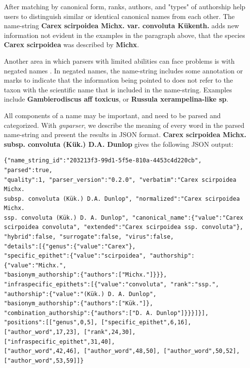 \documentclass{bmcart}
\begin{document}
After matching by canonical form, ranks, authors, and "types" of authorship
help users to distinguish similar or identical canonical names from each other.
The name-string \textbf{Carex scirpoidea Michx. var. convoluta Kükenth.} adds
new information not evident in the examples in the paragraph above, that the
species \textbf{Carex scirpoidea} was described by \textbf{Michx}.

Another area in which parsers with limited abilities can face  problems is with
negated names \cite{Patterson:inpress-a}. In negated names, the name-string
includes some annotation or marks to indicate that the information being
pointed to does not refer to the taxon with the scientific name that is
included in the name-string. Examples include \textbf{Gambierodiscus aff
toxicus}, or \textbf{Russula xerampelina-like sp}.

All components of a name may be important, and need to be parsed and
categorized. With \textit{gnparser}, we describe the meaning of every word in
the parsed name-string and present the results in JSON format.  \textbf{Carex
scirpoidea Michx.  subsp. convoluta (Kük.) D.A. Dunlop} gives the following
JSON output:

\vspace{0.5cm}

\begin{Verbatim}[fontsize=\small]
{"name_string_id":"203213f3-99d1-5f5e-810a-4453c4d220cb", "parsed":true,
"quality":1, "parser_version":"0.2.0", "verbatim":"Carex scirpoidea Michx.
subsp. convoluta (Kük.) D.A. Dunlop", "normalized":"Carex scirpoidea Michx.
ssp. convoluta (Kük.) D. A. Dunlop", "canonical_name":{"value":"Carex
scirpoidea convoluta", "extended":"Carex scirpoidea ssp. convoluta"},
"hybrid":false, "surrogate":false, "virus":false,
"details":[{"genus":{"value":"Carex"},
"specific_epithet":{"value":"scirpoidea", "authorship":{"value":"Michx.",
"basionym_authorship":{"authors":["Michx."]}}},
"infraspecific_epithets":[{"value":"convoluta", "rank":"ssp.",
"authorship":{"value":"(Kük.) D. A. Dunlop",
"basionym_authorship":{"authors":["Kük."]},
"combination_authorship":{"authors":["D. A. Dunlop"]}}}]}],
"positions":[["genus",0,5], ["specific_epithet",6,16],
["author_word",17,23], ["rank",24,30], ["infraspecific_epithet",31,40],
["author_word",42,46], ["author_word",48,50], ["author_word",50,52],
["author_word",53,59]]}
\end{Verbatim}

\vspace{0.5cm}
\end{document}
